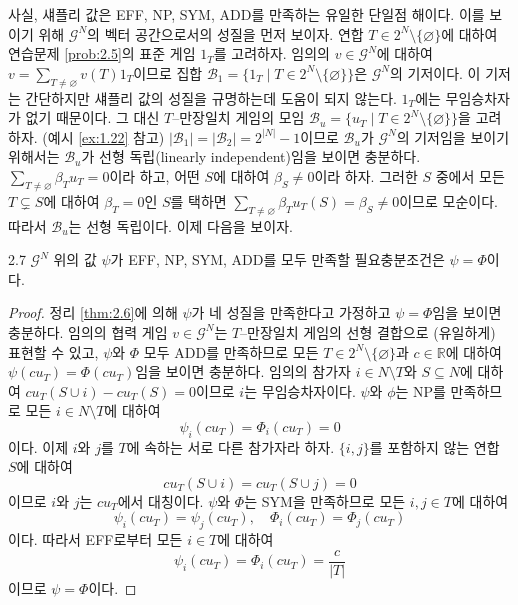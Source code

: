 \documentclass{article}
\numberwithin{equation}{section}
\begin{document}
사실, 섀플리 값은 EFF, NP, SYM, ADD를 만족하는 유일한 단일점 해이다. 이를 보이기 위해 $\mathcal G^N$의 벡터 공간으로서의 성질을 먼저 보이자. 연합 $T\in 2^N\setminus\{\varnothing\}$에 대하여 연습문제 \ref{prob:2.5}의 표준 게임 $1_T$를 고려하자. 임의의 $v\in\mathcal G^N$에 대하여 $v=\sum_{T\ne\varnothing}v(T)1_T$이므로 집합 $\mathcal B_1=\{1_T\mid T\in 2^N\setminus\{\varnothing\}\}$은 $\mathcal G^N$의 기저이다. 이 기저는 간단하지만 섀플리 값의 성질을 규명하는데 도움이 되지 않는다. $1_T$에는 무임승차자가 없기 때문이다. 그 대신 $T$--만장일치 게임의 모임 $\mathcal B_u=\{u_T\mid T\in 2^N\setminus\{\varnothing\}\}$을 고려하자. (예시 \ref{ex:1.22} 참고) $\vert\mathcal B_1\vert=\vert\mathcal B_2\vert=2^{\vert N\vert}-1$이므로 $\mathcal B_u$가 $\mathcal G^N$의 기저임을 보이기 위해서는 $\mathcal B_u$가 선형 독립(linearly independent)임을 보이면 충분하다. $\sum_{T\ne\varnothing}\beta_Tu_T=0$이라 하고, 어떤 $S$에 대하여 $\beta_S\ne0$이라 하자. 그러한 $S$ 중에서 모든 $T\subsetneq S$에 대하여 $\beta_T=0$인 $S$를 택하면 $\sum_{T\ne\varnothing}\beta_Tu_T(S)=\beta_S\ne0$이므로 모순이다. 따라서 $\mathcal B_u$는 선형 독립이다. 이제 다음을 보이자.

\begin{thm}{}{2.7}
	$\mathcal G^N$ 위의 값 $\psi$가 EFF, NP, SYM, ADD를 모두 만족할 필요충분조건은 $\psi=\Phi$이다.
\end{thm}

\begin{proof}
	정리 \ref{thm:2.6}에 의해 $\psi$가 네 성질을 만족한다고 가정하고 $\psi=\Phi$임을 보이면 충분하다. 임의의 협력 게임 $v\in\mathcal G^N$는 $T$--만장일치 게임의 선형 결합으로 (유일하게) 표현할 수 있고, $\psi$와 $\Phi$ 모두 ADD를 만족하므로 모든 $T\in 2^N\setminus\{\varnothing\}$과 $c\in\mathbb R$에 대하여 $\psi(cu_T)=\Phi(cu_T)$임을 보이면 충분하다. 임의의 참가자 $i\in N\setminus T$와 $S\subseteq N$에 대하여 $cu_T(S\cup i)-cu_T(S)=0$이므로 $i$는 무임승차자이다. $\psi$와 $\phi$는 NP를 만족하므로 모든 $i\in N\setminus T$에 대하여
	\begin{equation}
		\label{eq:2.4}
		\psi_i(cu_T)=\Phi_i(cu_T)=0
	\end{equation}
	이다. 이제 $i$와 $j$를 $T$에 속하는 서로 다른 참가자라 하자. $\{i,j\}$를 포함하지 않는 연합 $S$에 대하여 
	\[
		cu_T(S\cup i)=cu_T(S\cup j)=0
	\]
	이므로 $i$와 $j$는 $cu_T$에서 대칭이다. $\psi$와 $\Phi$는 SYM을 만족하므로 모든 $i,j\in T$에 대하여
	\[
		\psi_i(cu_T)=\psi_j(cu_T),\quad\Phi_i(cu_T)=\Phi_j(cu_T)
	\]
	이다. 따라서 EFF로부터 모든 $i\in T$에 대하여
	\begin{equation}
		\label{eq:2.5}
		\psi_i(cu_T)=\Phi_i(cu_T)=\frac{c}{\vert T\vert}
	\end{equation}
	이므로 $\psi=\Phi$이다.
\end{proof}
\end{document}
